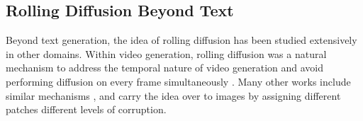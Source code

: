 \subsection{Rolling Diffusion Beyond Text}
Beyond text generation, the idea of rolling diffusion has been studied extensively in other domains.
Within video generation, rolling diffusion was a natural mechanism to address the temporal nature of video generation and avoid performing diffusion on every frame simultaneously \citep{ruhe2024rolling}.
Many other works include similar mechanisms \citep{chen2024diffusion, song2025history, xie2025progressive}, and \citet{papa2026asyncpatch} carry the idea over to images by assigning different patches different levels of corruption.
